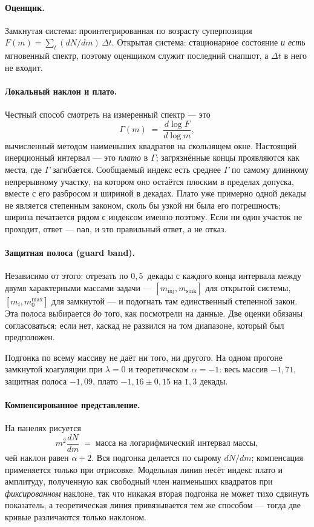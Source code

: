 \documentclass[a4paper,12pt]{article}
\newcommand{\minj}{m_{\mathrm{inj}}}
\newcommand{\msink}{m_{\mathrm{sink}}}
\newcommand{\code}[1]{\texttt{#1}}
\begin{document}
\paragraph{Оценщик.} Замкнутая система: про\-ин\-те\-гри\-ро\-ван\-ная по
возрасту суперпозиция $F(m) = \sum_t (dN/dm)\,\Delta t$. Открытая система:
стационарное состояние \emph{и есть} мгновенный спектр, поэтому оценщиком
служит последний снапшот, а $\Delta t$ в него не входит.

\paragraph{Локальный наклон и плато.} Честный способ смотреть на измеренный
спектр --- это
\begin{equation}
  \Gamma(m) \;=\; \frac{d\log F}{d\log m},
\end{equation}
вычисленный методом наименьших квадратов на скользящем окне. Настоящий
инерционный интервал --- это \emph{плато} в $\Gamma$; загрязнённые концы
проявляются как места, где $\Gamma$ загибается. Сообщаемый индекс есть
среднее $\Gamma$ по самому длинному непрерывному участку, на котором оно
остаётся плоским в пределах допуска, вместе с его разбросом и шириной в
декадах. Плато уже примерно одной декады не является степенным законом,
сколь бы узкой ни была его погрешность; ширина печатается рядом с индексом
именно поэтому. Если ни один участок не проходит, ответ --- \code{nan}, и
это правильный ответ, а не отказ.

\paragraph{Защитная полоса (guard band).} Независимо от этого: отрезать по
$0{,}5$~декады с каждого конца интервала между двумя характерными массами
задачи --- $[\minj,\msink]$ для открытой системы, $[m_i, m_0^{\max}]$ для
замкнутой --- и подогнать там единственный степенной закон. Эта полоса
выбирается \emph{до} того, как посмотрели на данные. Две оценки обязаны
согласоваться; если нет, каскад не развился на том диапазоне, который был
предположен.

Подгонка по всему массиву не даёт ни того, ни другого. На одном прогоне
замкнутой коагуляции при $\lambda=0$ и теоретическом $\alpha=-1$: весь
массив $-1{,}71$, защитная полоса $-1{,}09$, плато $-1{,}16 \pm 0{,}15$ на
$1{,}3$ декады.

\paragraph{Компенсированное представление.} На панелях рисуется
\begin{equation}
  m^2 \frac{dN}{dm} \;=\; \text{масса на логарифмический интервал массы},
\end{equation}
чей наклон равен $\alpha+2$. Вся подгонка делается по сырому $dN/dm$;
компенсация применяется только при отрисовке. Модельная линия несёт индекс
плато и амплитуду, полученную как свободный член наименьших квадратов при
\emph{фиксированном} наклоне, так что никакая вторая подгонка не может
тихо сдвинуть показатель, а теоретическая линия привязывается тем же
способом --- тогда две кривые различаются только наклоном.
\end{document}
